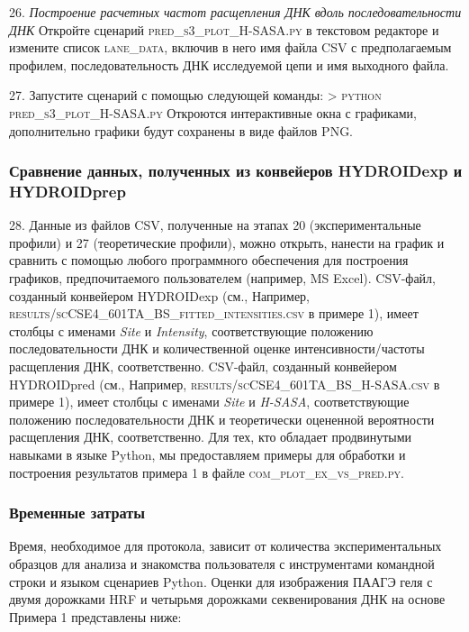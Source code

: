     26. \emph{Построение расчетных частот расщепления ДНК вдоль последовательности ДНК} Откройте сценарий \textsc{pred\_s3\_plot\_H-SASA.py} в текстовом редакторе и измените список \textsc{lane\_data}, включив в него имя файла CSV с предполагаемым профилем, последовательность ДНК исследуемой цепи и имя выходного файла.
    
    27. Запустите сценарий с помощью следующей команды:
            \textsc{> python pred\_s3\_plot\_H-SASA.py}
        Откроются интерактивные окна с графиками, дополнительно графики будут сохранены в виде файлов PNG.

    
    \subsubsection{Сравнение данных, полученных из конвейеров HYDROIDexp и HYDROIDprep}
    
    28. Данные из файлов CSV, полученные на этапах 20 (экспериментальные профили) и 27 (теоретические профили), можно открыть, нанести на график и сравнить с помощью любого программного обеспечения для построения графиков, предпочитаемого пользователем (например, MS Excel). CSV-файл, созданный конвейером HYDROIDexp (см., Например, \textsc{results/scCSE4\_601TA\_BS\_fitted\_intensities.csv} в примере 1), имеет столбцы с именами \textit{Site} и \textit{Intensity}, соответствующие положению последовательности ДНК и количественной оценке интенсивности/частоты расщепления ДНК, соответственно. CSV-файл, созданный конвейером HYDROIDpred (см., Например, \textsc{results/scCSE4\_601TA\_BS\_H-SASA.csv} в примере 1), имеет столбцы с именами \textit{Site} и \textit{H-SASA}, соответствующие положению последовательности ДНК и теоретически оцененной вероятности расщепления ДНК, соответственно.
    Для тех, кто обладает продвинутыми навыками в языке Python, мы предоставляем примеры для обработки и построения результатов примера 1 в файле \textsc{com\_plot\_ex\_vs\_pred.py}.
    
    \subsubsection{Временные затраты}

    Время, необходимое для протокола, зависит от количества экспериментальных образцов для анализа и знакомства пользователя с инструментами командной строки и языком сценариев Python. Оценки для изображения ПААГЭ геля с двумя дорожками HRF и четырьмя дорожками секвенирования ДНК на основе Примера 1 представлены ниже:

